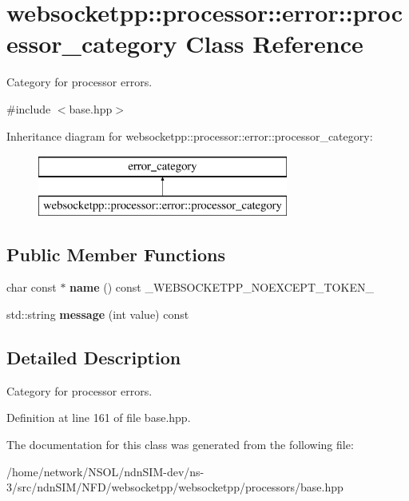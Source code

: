 \hypertarget{classwebsocketpp_1_1processor_1_1error_1_1processor__category}{}\section{websocketpp\+:\+:processor\+:\+:error\+:\+:processor\+\_\+category Class Reference}
\label{classwebsocketpp_1_1processor_1_1error_1_1processor__category}


Category for processor errors.  




{\ttfamily \#include $<$base.\+hpp$>$}

Inheritance diagram for websocketpp\+:\+:processor\+:\+:error\+:\+:processor\+\_\+category\+:\begin{figure}[H]
\begin{center}
\leavevmode
\includegraphics[height=2.000000cm]{classwebsocketpp_1_1processor_1_1error_1_1processor__category}
\end{center}
\end{figure}
\subsection*{Public Member Functions}
\begin{DoxyCompactItemize}
\item 
char const  $\ast$ {\bfseries name} () const \+\_\+\+W\+E\+B\+S\+O\+C\+K\+E\+T\+P\+P\+\_\+\+N\+O\+E\+X\+C\+E\+P\+T\+\_\+\+T\+O\+K\+E\+N\+\_\+\hypertarget{classwebsocketpp_1_1processor_1_1error_1_1processor__category_a587e3e9c5c86807a6ca0d15505e34486}{}\label{classwebsocketpp_1_1processor_1_1error_1_1processor__category_a587e3e9c5c86807a6ca0d15505e34486}

\item 
std\+::string {\bfseries message} (int value) const\hypertarget{classwebsocketpp_1_1processor_1_1error_1_1processor__category_af6c2ca60e45593c3fdc33eea8d711c34}{}\label{classwebsocketpp_1_1processor_1_1error_1_1processor__category_af6c2ca60e45593c3fdc33eea8d711c34}

\end{DoxyCompactItemize}


\subsection{Detailed Description}
Category for processor errors. 

Definition at line 161 of file base.\+hpp.



The documentation for this class was generated from the following file\+:\begin{DoxyCompactItemize}
\item 
/home/network/\+N\+S\+O\+L/ndn\+S\+I\+M-\/dev/ns-\/3/src/ndn\+S\+I\+M/\+N\+F\+D/websocketpp/websocketpp/processors/base.\+hpp\end{DoxyCompactItemize}
